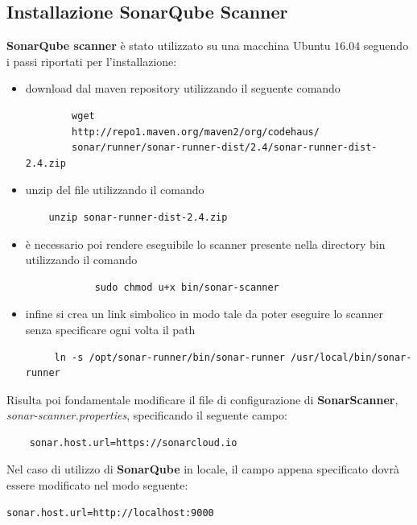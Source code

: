 \subsection{Installazione SonarQube Scanner}
\textbf{SonarQube scanner} è stato utilizzato su una macchina Ubuntu $16.04$ seguendo i passi riportati per l'installazione:
\begin{itemize}
	\item download dal maven repository utilizzando il seguente comando 
	\begin{verbatim}
		wget 
		http://repo1.maven.org/maven2/org/codehaus/
		sonar/runner/sonar-runner-dist/2.4/sonar-runner-dist-2.4.zip
	\end{verbatim}	
	\item unzip del file utilizzando il comando
	\begin{verbatim}
	unzip sonar-runner-dist-2.4.zip
	\end{verbatim}
	\item è necessario poi rendere eseguibile lo scanner presente nella directory bin utilizzando il comando 
	\begin{verbatim}
			sudo chmod u+x bin/sonar-scanner
	\end{verbatim}
	\item infine si crea un link simbolico in modo tale da poter eseguire lo scanner senza specificare ogni volta il path
	\begin{verbatim}
	 ln -s /opt/sonar-runner/bin/sonar-runner /usr/local/bin/sonar-runner
	\end{verbatim}
\end{itemize}
Risulta poi fondamentale modificare il file di configurazione di \textbf{SonarScanner}, \textit{sonar-scanner.properties}, specificando il seguente campo:
\begin{verbatim}
	sonar.host.url=https://sonarcloud.io
\end{verbatim}
Nel caso di utilizzo di \textbf{SonarQube} in locale, il campo appena specificato dovrà essere modificato nel modo seguente:
\begin{verbatim}
sonar.host.url=http://localhost:9000
\end{verbatim}

